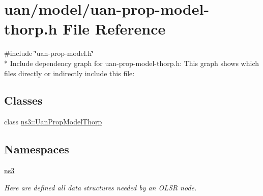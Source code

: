 \hypertarget{uan-prop-model-thorp_8h}{}\section{uan/model/uan-\/prop-\/model-\/thorp.h File Reference}
\label{uan-prop-model-thorp_8h}
{\ttfamily \#include \char`\"{}uan-\/prop-\/model.\+h\char`\"{}}\\*
Include dependency graph for uan-\/prop-\/model-\/thorp.h\+:
This graph shows which files directly or indirectly include this file\+:
\subsection*{Classes}
\begin{DoxyCompactItemize}
\item 
class \hyperlink{classns3_1_1UanPropModelThorp}{ns3\+::\+Uan\+Prop\+Model\+Thorp}
\end{DoxyCompactItemize}
\subsection*{Namespaces}
\begin{DoxyCompactItemize}
\item 
 \hyperlink{namespacens3}{ns3}
\begin{DoxyCompactList}\small\item\em Here are defined all data structures needed by an O\+L\+SR node. \end{DoxyCompactList}\end{DoxyCompactItemize}
